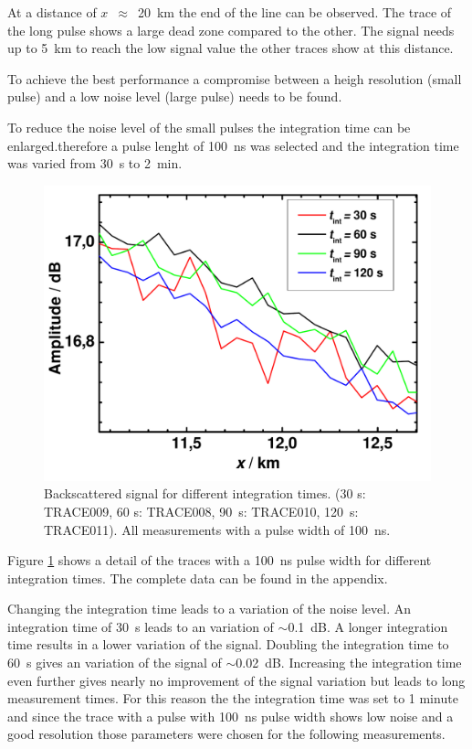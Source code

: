 At a distance of $x$~$\approx$~20~km the end of the line can be observed.
The trace of the long pulse shows a large dead zone compared to the other. The signal needs up to 5~km to reach the low signal value the other traces show at this distance. 


To achieve the best performance a compromise between a heigh resolution (small pulse) and a low noise level (large pulse) needs to be found.

To reduce the noise level of the small pulses the integration time can be enlarged.therefore a pulse lenght of 100~ns was selected and the integration time was varied from 30~s to 2~min. 


\begin{figure}[t]%
\centering
\includegraphics[width=.6\columnwidth]{grafiken/1_integration.pdf}%
\caption{Backscattered signal for different integration times. (30 s: TRACE009, 60 s: TRACE008, 90~s: TRACE010, 120~s: TRACE011). All measurements with a pulse width of 100~ns.}%
\label{fig:integration}%
\end{figure}

Figure \ref{fig:integration} shows a detail of the traces with a 100~ns pulse width for different integration times. The complete data can be found in the appendix.

Changing the integration time leads to a variation of the noise level. An integration time of 30~s leads to an variation of $\sim$0.1~dB. A longer integration time results in a lower variation of the signal. 
Doubling the integration time to 60~s gives an variation of the signal of $\sim$0.02~dB. Increasing the integration time even further gives nearly no improvement of the signal variation but leads to long measurement times.
For this reason the the integration time was set to 1 minute and since the trace with a pulse with 100~ns pulse width shows low noise and a good resolution those parameters were chosen for the following measurements.

